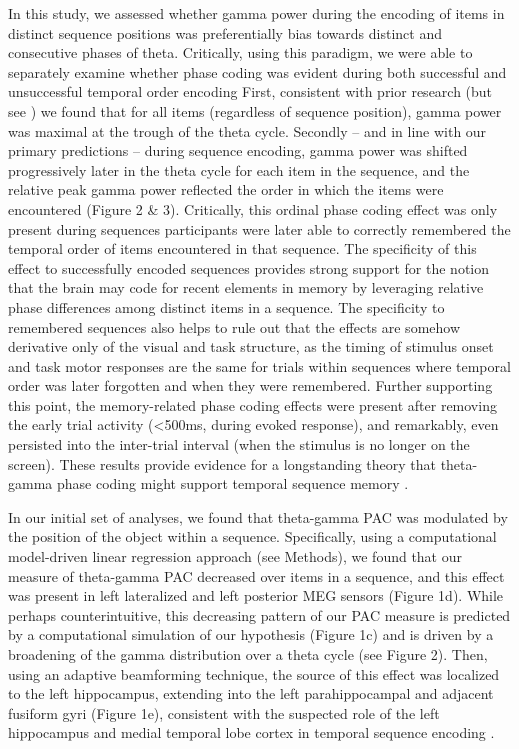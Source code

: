 In this study, we assessed whether gamma power during the encoding of
items in distinct sequence positions was preferentially bias towards
distinct and consecutive phases of theta. Critically, using this
paradigm, we were able to separately examine whether phase coding was
evident during both successful and unsuccessful temporal order encoding
First, consistent with prior research
\autocites{canolty_high_2006}{jacobs_neural_2009}{voytek_shifts_2010}
(but see \textcite{axmacher_cross-frequency_2010}) we found that for all
items (regardless of sequence position), gamma power was maximal at the
trough of the theta cycle. Secondly -- and in line with our primary
predictions -- during sequence encoding, gamma power was shifted
progressively later in the theta cycle for each item in the sequence,
and the relative peak gamma power reflected the order in which the items
were encountered (Figure 2 \& 3). Critically, this ordinal phase coding
effect was only present during sequences participants were later able to
correctly remembered the temporal order of items encountered in that
sequence. The specificity of this effect to successfully encoded
sequences provides strong support for the notion that the brain may code
for recent elements in memory by leveraging relative phase differences
among distinct items in a sequence. The specificity to remembered
sequences also helps to rule out that the effects are somehow derivative
only of the visual and task structure, as the timing of stimulus onset
and task motor responses are the same for trials within sequences where
temporal order was later forgotten and when they were remembered.
Further supporting this point, the memory-related phase coding effects
were present after removing the early trial activity (\textless{}500ms,
during evoked response), and remarkably, even persisted into the
inter-trial interval (when the stimulus is no longer on the screen).
These results provide evidence for a longstanding theory that
theta-gamma phase coding might support temporal sequence memory
\autocite{lisman_-_2013}.

In our initial set of analyses, we found that theta-gamma PAC was
modulated by the position of the object within a sequence. Specifically,
using a computational model-driven linear regression approach (see
Methods), we found that our measure of theta-gamma PAC decreased over
items in a sequence, and this effect was present in left lateralized and
left posterior MEG sensors (Figure 1d). While perhaps counterintuitive,
this decreasing pattern of our PAC measure is predicted by a
computational simulation of our hypothesis (Figure 1c) and is driven by
a broadening of the gamma distribution over a theta cycle (see Figure
2). Then, using an adaptive beamforming technique, the source of this
effect was localized to the left hippocampus, extending into the left
parahippocampal and adjacent fusiform gyri (Figure 1e), consistent with
the suspected role of the left hippocampus and medial temporal lobe
cortex in temporal sequence encoding
\autocites{dubrow_temporal_2014}{hsieh_hippocampal_2014}{jenkins_prefrontal_2010}{tubridy_medial_2011}.

